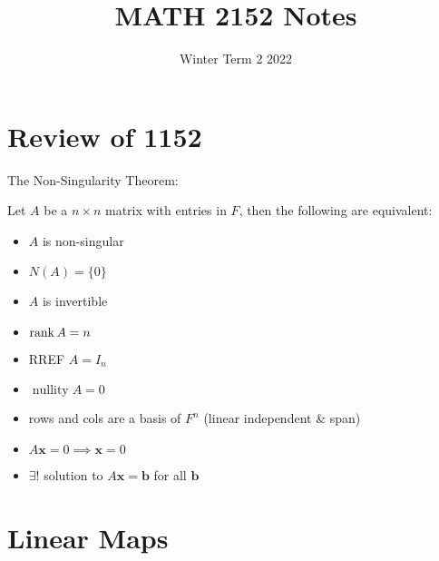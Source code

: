 \documentclass{article}
\DeclareMathOperator{\nullity}{nullity}
\begin{document}
\title{MATH 2152 Notes}
\date{Winter Term 2 2022}

\maketitle

\begin{tcolorbox}[title=, fonttitle=\huge\sffamily\bfseries\selectfont,interior style={left color=contcol1!40!white,right color=contcol2!40!white},frame style={left color=contcol1!80!white,right color=contcol2!80!white},coltitle=black,top=2mm,bottom=2mm,left=2mm,right=2mm,drop fuzzy shadow,enhanced,breakable]
  \tableofcontents
\end{tcolorbox}

\newpage
\section{Review of 1152}
\begin{theorem}
  The Non-Singularity Theorem:

  Let $A$ be a $n \times n$ matrix with entries in $F$, then the following are equivalent:
  \begin{itemize}
    \item $A$ is non-singular
    \item $N(A) = \{0\}$
    \item $A$ is invertible
    \item $\rank A = n$
    \item RREF $A = I_n$
    \item $\nullity A = 0$
    \item rows and cols are a basis of $F^n$ (linear independent \& span)
    \item $A\textbf{x} = 0 \implies \textbf{x} = 0$
    \item $\exists!$ solution to $A\textbf{x} = \textbf{b}$ for all $\textbf{b}$
  \end{itemize}
\end{theorem}
\section{Linear Maps}
\end{document}
